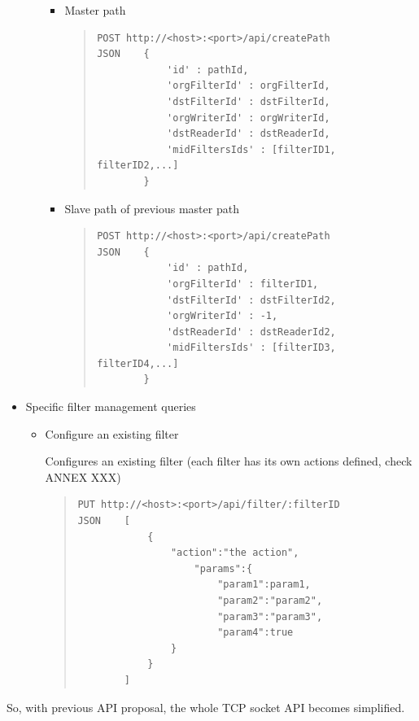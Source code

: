 \begin{itemize}
\begin{itemize}
\begin{itemize}

\item Master path
\begin{quote}
\begin{verbatim}
POST http://<host>:<port>/api/createPath
JSON    { 
            'id' : pathId, 
            'orgFilterId' : orgFilterId, 
            'dstFilterId' : dstFilterId, 
            'orgWriterId' : orgWriterId, 
            'dstReaderId' : dstReaderId, 
            'midFiltersIds' : [filterID1, filterID2,...] 
        }
\end{verbatim}
\end{quote}
\item Slave path of previous master path
\begin{quote}
\begin{verbatim}
POST http://<host>:<port>/api/createPath
JSON    { 
            'id' : pathId, 
            'orgFilterId' : filterID1, 
            'dstFilterId' : dstFilterId2, 
            'orgWriterId' : -1, 
            'dstReaderId' : dstReaderId2, 
            'midFiltersIds' : [filterID3, filterID4,...] 
        }  
\end{verbatim}
\end{quote}
\end{itemize}
\end{itemize}
\item Specific filter management queries        
\begin{itemize}
\item Configure an existing filter \hfill

Configures an existing filter (each filter has its own actions defined, check ANNEX XXX)
\begin{quote}
\begin{verbatim}
PUT http://<host>:<port>/api/filter/:filterID
JSON    [
            {
                "action":"the action",
                    "params":{
                        "param1":param1,
                        "param2":"param2",
                        "param3":"param3",
                        "param4":true
                }
            }
        ]
\end{verbatim}
\end{quote}

\end{itemize}
\end{itemize}

So, with previous API proposal, the whole TCP socket API becomes simplified.

